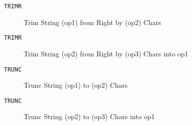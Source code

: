 
\begin{description}
\item[\texttt{TRIMR      }]  Trim String (op1) from Right by (op2) Chars\\
\end{description}

\begin{description}
\item[\texttt{TRIMR      }]  Trim String (op2) from Right by (op3) Chars into op1\\
\end{description}

\begin{description}
\item[\texttt{TRUNC      }]  Trunc String (op1) to (op2) Chars\\
\end{description}

\begin{description}
\item[\texttt{TRUNC      }]  Trunc String (op2) to (op3) Chars into op1\\
\end{description}

